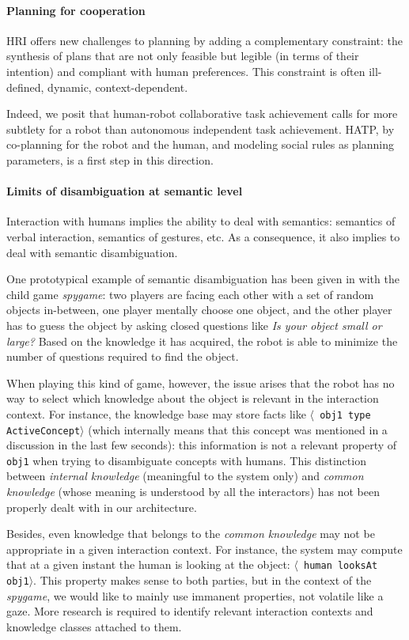 \documentclass[preprint,3p,times]{elsarticle}
\newcommand{\concept}[1]{{\small \texttt{#1}}}
\newcommand{\stmt}[1]{{\footnotesize \tt $\langle$ #1\relax$\rangle$}}
\begin{document}
\paragraph{Planning for cooperation} HRI offers new challenges to planning
by adding a complementary constraint: the synthesis of plans that are not only
feasible but legible (in terms of their intention) and compliant with human
preferences. This constraint is often ill-defined, dynamic, context-dependent.

Indeed, we posit that human-robot collaborative task achievement calls for more
subtlety for a robot than autonomous independent task achievement. HATP, by
co-planning for the robot and the human, and modeling social rules as planning
parameters, is a first step in this direction.

\paragraph{Limits of disambiguation at semantic level}

Interaction with humans implies the ability to deal with semantics: semantics of
verbal interaction, semantics of gestures, etc.  As a consequence, it also
implies to deal with semantic disambiguation.

One prototypical example of semantic disambiguation has been given in
\cite{Ros2010b} with the child game \emph{spygame}: two players are facing
each other with a set of random objects in-between, one player mentally choose
one object, and the other player has to guess the object by asking closed
questions like \emph{Is your object small or large?} Based on the knowledge it
has acquired, the robot is able to minimize the number of questions required to
find the object.

When playing this kind of game, however, the issue arises that the robot has no
way to select which knowledge about the object is relevant in the interaction
context. For instance, the knowledge base may store facts like \stmt{obj1 type
ActiveConcept} (which internally means that this concept was mentioned in a
discussion in the last few seconds): this information is not a relevant
property of \concept{obj1} when trying to disambiguate concepts with humans.
This distinction between \emph{internal knowledge} (meaningful to
the system only) and \emph{common knowledge} (whose meaning is understood by
all the interactors) has not been properly dealt with in our architecture.

Besides, even knowledge that belongs to the \emph{common knowledge} may not be
appropriate in a given interaction context. For instance, the system may
compute that at a given instant the human is looking at the object: \stmt{human
looksAt obj1}. This property makes sense to both parties, but in the context of
the \emph{spygame}, we would like to mainly use immanent properties, not
volatile like a gaze. More research is required to identify relevant
interaction contexts and knowledge classes attached to them.
\end{document}
